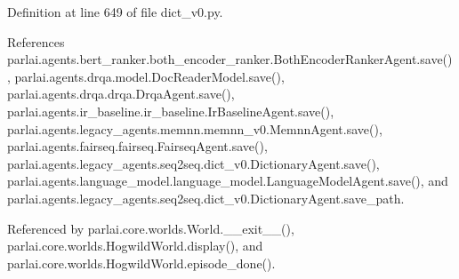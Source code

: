 Definition at line 649 of file dict\+\_\+v0.\+py.



References parlai.\+agents.\+bert\+\_\+ranker.\+both\+\_\+encoder\+\_\+ranker.\+Both\+Encoder\+Ranker\+Agent.\+save(), parlai.\+agents.\+drqa.\+model.\+Doc\+Reader\+Model.\+save(), parlai.\+agents.\+drqa.\+drqa.\+Drqa\+Agent.\+save(), parlai.\+agents.\+ir\+\_\+baseline.\+ir\+\_\+baseline.\+Ir\+Baseline\+Agent.\+save(), parlai.\+agents.\+legacy\+\_\+agents.\+memnn.\+memnn\+\_\+v0.\+Memnn\+Agent.\+save(), parlai.\+agents.\+fairseq.\+fairseq.\+Fairseq\+Agent.\+save(), parlai.\+agents.\+legacy\+\_\+agents.\+seq2seq.\+dict\+\_\+v0.\+Dictionary\+Agent.\+save(), parlai.\+agents.\+language\+\_\+model.\+language\+\_\+model.\+Language\+Model\+Agent.\+save(), and parlai.\+agents.\+legacy\+\_\+agents.\+seq2seq.\+dict\+\_\+v0.\+Dictionary\+Agent.\+save\+\_\+path.



Referenced by parlai.\+core.\+worlds.\+World.\+\_\+\+\_\+exit\+\_\+\+\_\+(), parlai.\+core.\+worlds.\+Hogwild\+World.\+display(), and parlai.\+core.\+worlds.\+Hogwild\+World.\+episode\+\_\+done().

